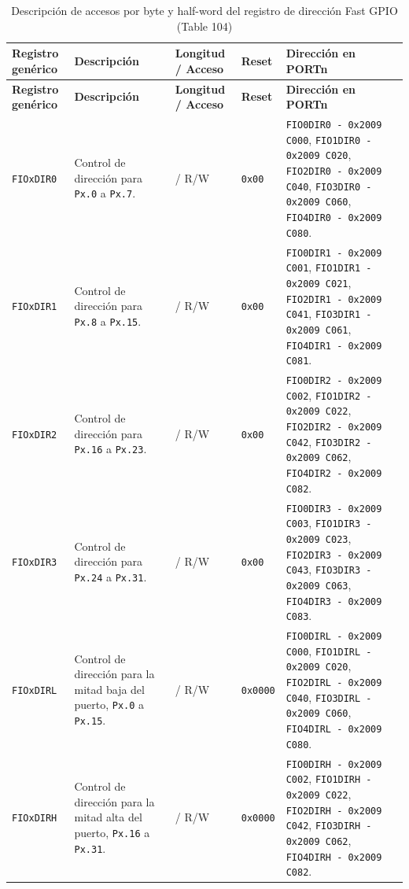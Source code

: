 \begin{longtable}{|>{\raggedright\arraybackslash}p{}|>{\raggedright\arraybackslash}p{}|>{\centering\arraybackslash}p{}|>{\centering\arraybackslash}p{}|>{\raggedright\arraybackslash}p{}|}
\caption{Descripción de accesos por byte y half-word del registro de dirección Fast GPIO (Table 104)} \\
\hline
\textbf{Registro genérico} & \textbf{Descripción} & \textbf{Longitud / Acceso} & \textbf{Reset} & \textbf{Dirección en PORTn} \\
\hline
\endfirsthead
\hline
\textbf{Registro genérico} & \textbf{Descripción} & \textbf{Longitud / Acceso} & \textbf{Reset} & \textbf{Dirección en PORTn} \\
\hline
\endhead
\texttt{FIOxDIR0} & Control de dirección para \texttt{Px.0} a \texttt{Px.7}. & 8 / R/W & \texttt{0x00} & \texttt{FIO0DIR0 - 0x2009 C000}, \texttt{FIO1DIR0 - 0x2009 C020}, \texttt{FIO2DIR0 - 0x2009 C040}, \texttt{FIO3DIR0 - 0x2009 C060}, \texttt{FIO4DIR0 - 0x2009 C080}. \\
\hline
\texttt{FIOxDIR1} & Control de dirección para \texttt{Px.8} a \texttt{Px.15}. & 8 / R/W & \texttt{0x00} & \texttt{FIO0DIR1 - 0x2009 C001}, \texttt{FIO1DIR1 - 0x2009 C021}, \texttt{FIO2DIR1 - 0x2009 C041}, \texttt{FIO3DIR1 - 0x2009 C061}, \texttt{FIO4DIR1 - 0x2009 C081}. \\
\hline
\texttt{FIOxDIR2} & Control de dirección para \texttt{Px.16} a \texttt{Px.23}. & 8 / R/W & \texttt{0x00} & \texttt{FIO0DIR2 - 0x2009 C002}, \texttt{FIO1DIR2 - 0x2009 C022}, \texttt{FIO2DIR2 - 0x2009 C042}, \texttt{FIO3DIR2 - 0x2009 C062}, \texttt{FIO4DIR2 - 0x2009 C082}. \\
\hline
\texttt{FIOxDIR3} & Control de dirección para \texttt{Px.24} a \texttt{Px.31}. & 8 / R/W & \texttt{0x00} & \texttt{FIO0DIR3 - 0x2009 C003}, \texttt{FIO1DIR3 - 0x2009 C023}, \texttt{FIO2DIR3 - 0x2009 C043}, \texttt{FIO3DIR3 - 0x2009 C063}, \texttt{FIO4DIR3 - 0x2009 C083}. \\
\hline
\texttt{FIOxDIRL} & Control de dirección para la mitad baja del puerto, \texttt{Px.0} a \texttt{Px.15}. & 16 / R/W & \texttt{0x0000} & \texttt{FIO0DIRL - 0x2009 C000}, \texttt{FIO1DIRL - 0x2009 C020}, \texttt{FIO2DIRL - 0x2009 C040}, \texttt{FIO3DIRL - 0x2009 C060}, \texttt{FIO4DIRL - 0x2009 C080}. \\
\hline
\texttt{FIOxDIRH} & Control de dirección para la mitad alta del puerto, \texttt{Px.16} a \texttt{Px.31}. & 16 / R/W & \texttt{0x0000} & \texttt{FIO0DIRH - 0x2009 C002}, \texttt{FIO1DIRH - 0x2009 C022}, \texttt{FIO2DIRH - 0x2009 C042}, \texttt{FIO3DIRH - 0x2009 C062}, \texttt{FIO4DIRH - 0x2009 C082}. \\
\hline
\end{longtable}

